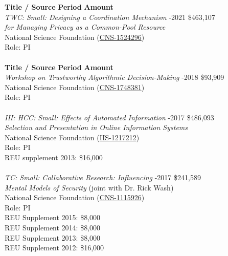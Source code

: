 \documentclass[9pt]{extarticle}
\begin{document}
\begin{tabbing}
\textbf{Title / Source} \hspace{2.75in}\= \textbf{Period} \hspace{0.5in}\= \textbf{Amount} \\
\emph{TWC: Small: Designing a Coordination Mechanism} -2021 \> \$463,107 \\
\emph{for Managing Privacy as a Common-Pool Resource} \\ 
National Science Foundation (\href{http://www.nsf.gov/awardsearch/showAward?AWD_ID=1524296}{CNS-1524296}) \\ 
Role: PI \\\\ %

\textbf{Title / Source} \hspace{2.75in}\= \textbf{Period} \hspace{0.5in}\= \textbf{Amount} \\
\emph{Workshop on Trustworthy Algorithmic Decision-Making} -2018 \> \$93,909 \\
National Science Foundation (\href{https://www.nsf.gov/awardsearch/showAward?AWD_ID=1748381}{CNS-1748381}) \\ 
Role: PI \\\\

\emph{III: HCC: Small: Effects of Automated Information} -2017 \> \$486,093 \\
\emph{Selection and Presentation in Online Information Systems} \\ 
National Science Foundation (\href{http://nsf.gov/awardsearch/showAward.do?AwardNumber=1217212}{IIS-1217212}) \\ 
Role: PI \\
	\hspace{1cm}REU supplement 2013: \$16,000 \\\\

\emph{TC: Small: Collaborative Research: Influencing} -2017 \> \$241,589 \\
\emph{Mental Models of Security} (joint with Dr. Rick Wash) \\ 
National Science Foundation (\href{http://nsf.gov/awardsearch/showAward.do?AwardNumber=1115926}{CNS-1115926}) \\ Role: PI \\
	\hspace{1cm}REU Supplement 2015: \$8,000 \\
	\hspace{1cm}REU Supplement 2014: \$8,000 \\
	\hspace{1cm}REU Supplement 2013: \$8,000 \\
	\hspace{1cm}REU Supplement 2012: \$16,000 \\\\


\end{tabbing}
\end{document}

